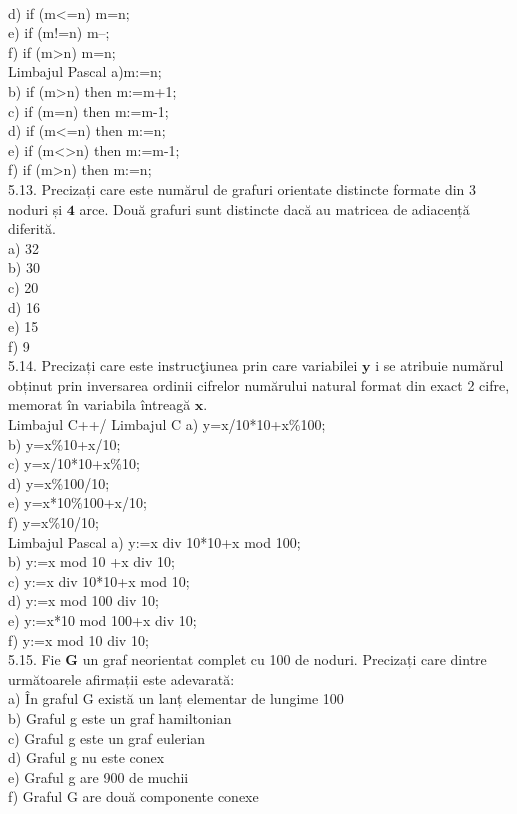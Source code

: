 \\
d) if (m<=n) m=n;
\\
e) if (m!=n) m--;
\\
f) if (m>n) m=n;
\\
Limbajul Pascal
a)m:=n;
\\
b) if (m>n) then m:=m+1;
\\
c) if (m=n) then m:=m-1;
\\
d) if (m<=n) then m:=n;
\\
e) if (m<>n) then m:=m-1;
\\
f) if (m>n) then m:=n;
\\
5.13. Precizați care este numărul de grafuri orientate distincte formate din 3 noduri și $\mathbf{4}$ arce. Două grafuri sunt distincte dacă au matricea de adiacență diferită.
\\
a) 32
\\
b) 30
\\
c) 20
\\
d) 16
\\
e) 15
\\
f) 9
\\
5.14. Precizați care este instrucţiunea prin care variabilei $\mathbf{y}$ i se atribuie numărul obținut prin inversarea ordinii cifrelor numărului natural format din exact 2 cifre, memorat în variabila întreagă $\mathbf{x}$.
\\
Limbajul C++/ Limbajul C
a) y=x/10*10+x\%100;
\\
b) y=x\%10+x/10;
\\
c) y=x/10*10+x\%10;
\\ 
d) y=x\%100/10;
\\
e) y=x*10\%100+x/10;
\\ 
f) y=x\%10/10;
\\
Limbajul Pascal
a) y:=x div 10*10+x mod 100;
\\
b) y:=x mod 10 +x div 10;
\\
c) y:=x div 10*10+x mod 10;
\\
d) y:=x mod 100 div 10;
\\
e) y:=x*10 mod 100+x div 10;
\\
f) y:=x mod 10 div 10;
\\
5.15. Fie $\mathbf{G}$ un graf neorientat complet cu 100 de noduri. Precizați care dintre următoarele afirmații este adevarată:
\\
a) În graful G există un lanț elementar de lungime 100
\\
b) Graful g este un graf hamiltonian
\\
c) Graful g este un graf eulerian
\\
d) Graful g nu este conex
\\
e) Graful g are 900 de muchii
\\
f) Graful G are două componente conexe
\\

